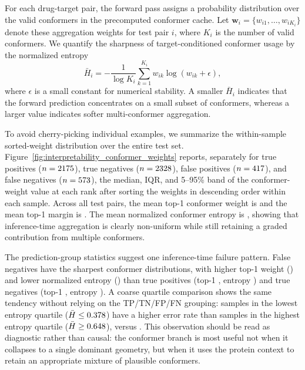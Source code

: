 For each drug-target pair, the forward pass assigns a probability distribution over the valid conformers in the precomputed conformer cache. Let $\mathbf{w}_i=\{w_{i1},\ldots,w_{iK_i}\}$ denote these aggregation weights for test pair $i$, where $K_i$ is the number of valid conformers. We quantify the sharpness of target-conditioned conformer usage by the normalized entropy
\begin{equation}
\bar{H}_i=-\frac{1}{\log K_i}\sum_{k=1}^{K_i} w_{ik}\log(w_{ik}+\epsilon),
\end{equation}
where $\epsilon$ is a small constant for numerical stability. A smaller $\bar{H}_i$ indicates that the forward prediction concentrates on a small subset of conformers, whereas a larger value indicates softer multi-conformer aggregation.

To avoid cherry-picking individual examples, we summarize the within-sample sorted-weight distribution over the entire test set. Figure~\ref{fig:interpretability_conformer_weights} reports, separately for true positives ($n=2175$), true negatives ($n=2328$), false positives ($n=417$), and false negatives ($n=573$), the median, IQR, and 5--95\% band of the conformer-weight value at each rank after sorting the weights in descending order within each sample. Across all test pairs, the mean top-1 conformer weight is \InterpTopOneMean{} and the mean top-1 margin is \InterpMarginMean. The mean normalized conformer entropy is \InterpEntropyMean, showing that inference-time aggregation is clearly non-uniform while still retaining a graded contribution from multiple conformers.

The prediction-group statistics suggest one inference-time failure pattern. False negatives have the sharpest conformer distributions, with higher top-1 weight (\InterpFNTopOne) and lower normalized entropy (\InterpFNEntropy) than true positives (top-1 \InterpTPTopOne, entropy \InterpTPEntropy) and true negatives (top-1 \InterpTNTopOne, entropy \InterpTNEntropy). A coarse quartile comparison shows the same tendency without relying on the TP/TN/FP/FN grouping: samples in the lowest entropy quartile ($\bar{H}\le0.378$) have a higher error rate than samples in the highest entropy quartile ($\bar{H}\ge0.648$), \InterpLowEntropyErrorRate{} versus \InterpHighEntropyErrorRate. This observation should be read as diagnostic rather than causal: the conformer branch is most useful not when it collapses to a single dominant geometry, but when it uses the protein context to retain an appropriate mixture of plausible conformers.

